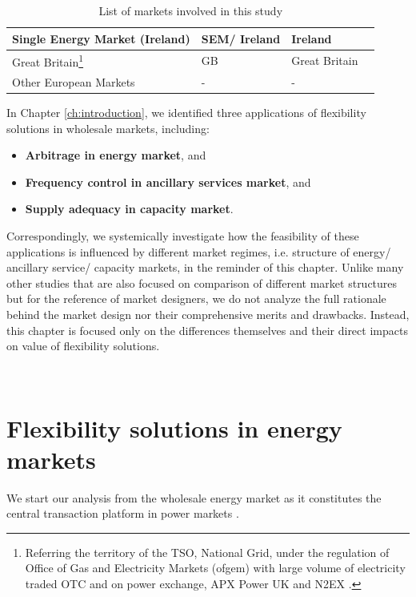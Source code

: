 \begin{table}[h!]
\begin{tabular}{L{5cm} l l l}
		\hline
		Single Energy Market (Ireland) & SEM/ Ireland & Ireland & \cite{FrontierEconomics2016,Cochran2013}\\
		\hline
		Great Britain\footnote{Referring the territory of the TSO, National Grid, under the regulation of Office of Gas and Electricity Markets (ofgem) with large volume of electricity traded OTC and on power exchange, APX Power UK and N2EX .} & GB & Great Britain & \cite{Rebours2009,FrontierEconomics2016,ofgem_cm,ofgem_m,EnergyUK2017} \\
		\hline
		Other European Markets & - & - & \cite{FrontierEconomics2016}\\
		\hline
		\hline
	\end{tabular}
	\caption{List of markets involved in this study} \label{tab:markets}
\end{table}

In Chapter \ref{ch:introduction}, we identified three applications of flexibility solutions in wholesale markets, including:

\begin{itemize}
	\item \textbf{Arbitrage in energy market}, and
	\item \textbf{Frequency control in ancillary services market}, and
	\item \textbf{Supply adequacy in capacity market}. 
\end{itemize}

Correspondingly, we systemically investigate how the feasibility of these applications is influenced by different market regimes, i.e. structure of energy/ ancillary service/ capacity markets, in the reminder of this chapter. Unlike many other studies that are also focused on comparison of different market structures but for the reference of market designers, we do not analyze the full rationale behind the market design nor their comprehensive merits and drawbacks. Instead, this chapter is focused only on the differences themselves and their direct impacts on value of flexibility solutions.


~\newpage

\section[Flexibility solutions in energy markets]{Flexibility solutions in energy markets%
	}
\label{sec:market-energy}
We start our analysis from the wholesale energy market as it constitutes the central transaction platform in power markets \cite{Cochran2013}. 

